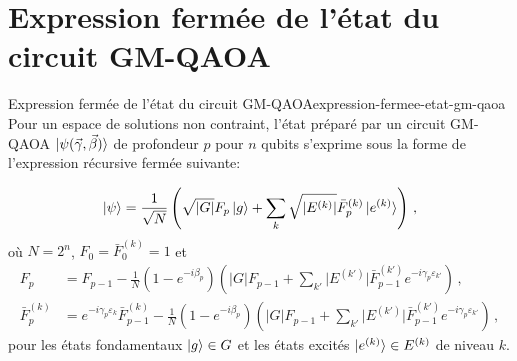 \begin{comment}
\end{comment}


\chapter{Expression fermée de l'état du circuit GM-QAOA}
\label{ann:expression-fermee-etat-circuit-gm-qaoa}


\begin{maintheorem}{Expression fermée de l'état du circuit GM-QAOA}{expression-fermee-etat-gm-qaoa}
    Pour un espace de solutions non contraint, l'état préparé par un circuit GM-QAOA $\ket{\psi(\vec{\gamma}, \vec{\beta})}$ de profondeur $p$ pour $n$ qubits s'exprime sous la forme de l'expression récursive fermée suivante:

    \begin{equation}
        \label{eq:recursive-formula}
        \ket{\psi} = \frac{1}{\sqrt{ N }} \left( \sqrt{ \lvert G \rvert } F_{p} \ket{g} + \sum_{k} \sqrt{ \lvert E^{(k)} \rvert } \bar{F}^{(k)}_{p} \ket{e^{(k)}} \right) \,,
    \end{equation}
    où $N=2^{n}$, $F_{0}=\bar{F}_{0}^{(k)}=1$ et
    \begin{align}
        F_{p} &= F_{p-1} - \frac{1}{N} (1-e^{-i\beta_{p}}) \left( \lvert G \rvert   F_{p-1} + \sum_{k'} \lvert E^{(k')} \rvert \bar{F}^{(k')}_{p-1} e^{-i\gamma_{p}\varepsilon_{k'}} \right) \,, \\
        \bar{F}^{(k)}_{p} &= e^{-i\gamma_{p} \varepsilon_{k}}\bar{F}_{p-1}^{(k)} - \frac{1}{N} (1-e^{-i\beta_{p}}) \left( \lvert G \rvert   F_{p-1} + \sum_{k'} \lvert E^{(k')} \rvert \bar{F}^{(k')}_{p-1} e^{-i\gamma_{p}\varepsilon_{k'}} \right) \,,
    \end{align}
    pour les états fondamentaux $\ket{g} \in G$ et les états excités $\ket{e^{(k)}} \in E^{(k)}$ de niveau $k$.
\end{maintheorem}

